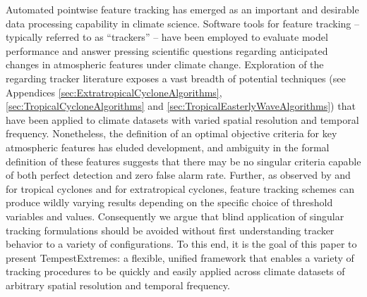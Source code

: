 \documentclass[gmdd, hvmath, online]{copernicus_discussions}
\begin{document}



\introduction  %

Automated pointwise feature tracking has emerged as an important and desirable data processing capability in climate science.  Software tools for feature tracking -- typically referred to as ``trackers'' -- have been employed to evaluate model performance and answer pressing scientific questions regarding anticipated changes in atmospheric features under climate change.  Exploration of the regarding tracker literature exposes a vast breadth of potential techniques (see Appendices \ref{sec:ExtratropicalCycloneAlgorithms}, \ref{sec:TropicalCycloneAlgorithms} and \ref{sec:TropicalEasterlyWaveAlgorithms}) that have been applied to climate datasets with varied spatial resolution and temporal frequency.  Nonetheless, the definition of an optimal objective criteria for key atmospheric features has eluded development, and ambiguity in the formal definition of these features suggests that there may be no singular criteria capable of both perfect detection and zero false alarm rate.  Further, as observed by \cite{walsh2007objectively} and \citet{horn2014tracking} for tropical cyclones and \cite{neu2013imilast} for extratropical cyclones, feature tracking schemes can produce wildly varying results depending on the specific choice of threshold variables and values. Consequently we argue that blind application of singular tracking formulations should be avoided without first understanding tracker behavior to a variety of configurations. To this end, it is the goal of this paper to present TempestExtremes: a flexible, unified framework that enables a variety of tracking procedures to be quickly and easily applied across climate datasets of arbitrary spatial resolution and temporal frequency.
\end{document}
